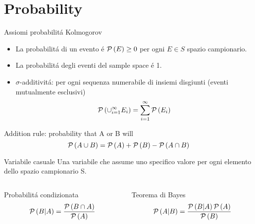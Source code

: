 \section{Probability}

\begin{frame}{Assiomi probabilit\'a Kolmogorov}
\begin{itemize}
\item La probabilit\'a di un evento \'e $\operatorname{\mathcal{P}}{(E)}\geq0$ per ogni $E\in S$ spazio campionario.
\item La probabilit\'a degli eventi del sample space \'e 1.
\item $\sigma$-additivit\'a: per ogni sequenza numerabile di insiemi disgiunti (eventi mutualmente esclusivi)
\begin{equation*}
\operatorname{\mathcal{P}}{(\cup_{i=1}^{\infty}E_i)}=\sum_{i=1}^{\infty}\operatorname{\mathcal{P}}{(E_i)}
\end{equation*}
\end{itemize}
\begin{block}{Addition rule: probability that A or B will}
\begin{equation*}
\operatorname{\mathcal{P}}{(A\cup B)}=\operatorname{\mathcal{P}}{(A)}+\operatorname{\mathcal{P}}{(B)}-\operatorname{\mathcal{P}}{(A\cap B)}
\end{equation*}
\end{block}
\begin{block}{Variabile casuale}
Una variabile che assume uno specifico valore per ogni elemento dello spazio campionario S.
\end{block}
\begin{columns}[T]
\begin{column}{0.5\textwidth}
\begin{block}{Probabilit\'a condizionata}
\begin{equation*}
\operatorname{\mathcal{P}}{(B|A)}=\frac{\operatorname{\mathcal{P}}{(B\cap A)}}{\operatorname{\mathcal{P}}{(A)}}
\end{equation*}
\end{block}
\end{column}
\begin{column}{0.5\textwidth}
\begin{block}{Teorema di Bayes}
\begin{equation*}
\operatorname{\mathcal{P}}{(A|B)}=\frac{\operatorname{\mathcal{P}}{(B|A)}\operatorname{\mathcal{P}}{(A)}}{\operatorname{\mathcal{P}}{(B)}}
\end{equation*}
\end{block}
\end{column}
\end{columns}
\end{frame}

